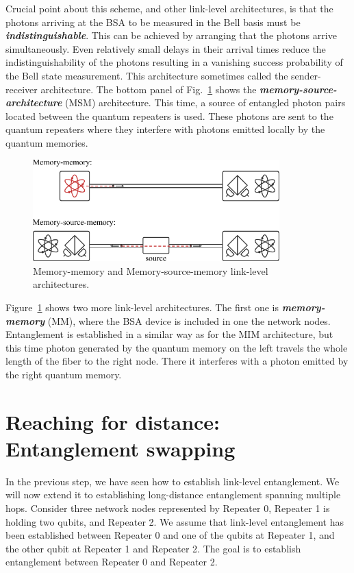 Crucial point about this scheme, and other link-level architectures, is that the photons arriving at the BSA to be measured in the Bell basis must be \textit{\textbf{indistinguishable}}.
This can be achieved by arranging that the photons arrive simultaneously. 
Even relatively small delays in their arrival times reduce the indistinguishability of the photons resulting in a vanishing success probability of the Bell state measurement.
This architecture sometimes called the sender-receiver architecture.
The bottom panel of Fig.~\ref{fig:12-2_MM_MSM} shows the \textit{\textbf{memory-source-architecture}} (MSM) architecture.
This time, a source of entangled photon pairs located between the quantum repeaters is used.
These photons are sent to the quantum repeaters where they interfere with photons emitted locally by the quantum memories.

\begin{figure}[t]
    \centering
    \includegraphics[width=0.85\textwidth]{lesson12/12-2_MM_MSM.pdf}
    \caption[MM and MSM architectures]{Memory-memory and Memory-source-memory link-level architectures.}
    \label{fig:12-2_MM_MSM}
\end{figure}

Figure~\ref{fig:12-2_MM_MSM} shows two more link-level architectures.
The first one is \textit{\textbf{memory-memory}} (MM), where the BSA device is included in one the network nodes.
Entanglement is established in a similar way as for the MIM architecture, but this time photon generated by the quantum memory on the left travels the whole length of the fiber to the right node.
There it interferes with a photon emitted by the right quantum memory.


\section{Reaching for distance: Entanglement swapping}
\label{sec:fig:12-3_reaching_for_distance}

In the previous step, we have seen how to establish link-level entanglement.
We will now extend it to establishing long-distance entanglement spanning multiple hops.
Consider three network nodes represented by Repeater 0, Repeater 1 is holding two qubits, and Repeater 2.
We assume that link-level entanglement has been established between Repeater 0 and one of the qubits at Repeater 1, and the other qubit at Repeater 1 and Repeater 2.
The goal is to establish entanglement between Repeater 0 and Repeater 2.

